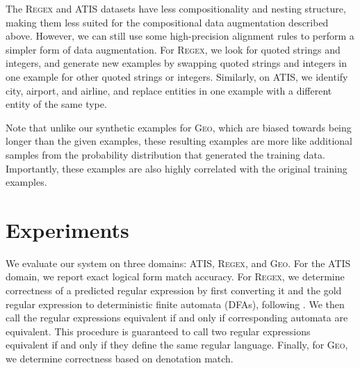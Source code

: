 \documentclass[11pt,letterpaper]{article}
\newcommand{\atis}{\textsc{ATIS}\xspace}
\newcommand{\regex}{\textsc{Regex}\xspace}
\newcommand{\geo}{\textsc{Geo}\xspace}
\newcommand\pl[1]{\textcolor{red}{[PL: #1]}}
\newcommand\rj[1]{\textcolor{blue}{[RJ: #1]}}
\begin{document}
The \regex and \atis datasets have 
less compositionality and nesting structure,
making them less suited for the compositional data augmentation
described above.
However, we can still use some high-precision alignment rules
to perform a simpler form of data augmentation.
For \regex, we look for quoted strings and integers,
and generate new examples by
swapping quoted strings and integers in one example
for other quoted strings or integers.
Similarly, on \atis, we identify city, airport, and airline,
and replace entities in one example with a different entity
of the same type.

Note that unlike our synthetic examples for \geo, which are biased
towards being longer than the given examples, these resulting examples
are more like additional samples from the probability distribution
that generated the training data.
Importantly, these examples are also highly correlated with the
original training examples.

%

\section{Experiments}
We evaluate our system on three domains: \atis, \regex, and \geo.
For the \atis domain, we report exact logical form match accuracy.
For \regex, we determine correctness of a predicted regular expression
by first converting it and the gold regular expression to
deterministic finite automata (DFAs), following .
We then call the regular expressions
equivalent if and only if corresponding automata are equivalent.
This procedure is guaranteed to call two regular expressions equivalent
if and only if they define the same regular language.
Finally, for \geo, we determine correctness based on denotation match.
\end{document}
